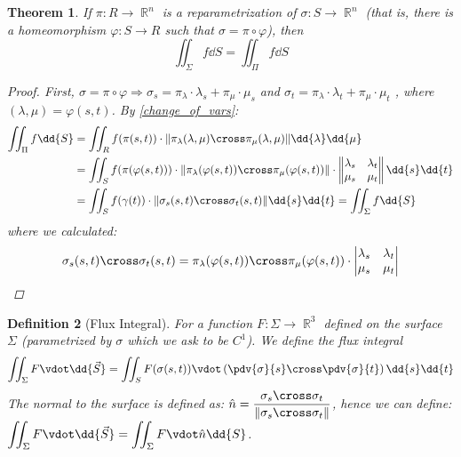 \documentclass[12pt]{article}
\let\RA\Rightarrow
\DeclareMathOperator{\R}{\mathbb{R}}
\newtheorem{theorem}{Theorem}[subsection]
\newtheorem{definition}[theorem]{Definition}
\begin{document}
\begin{theorem}
  If $\pi:R\to\R^n$ is a reparametrization of $\sigma:S\to\R^n$ (that is, there is a homeomorphism $\varphi:S\to R$ such that $\sigma=\pi\circ\varphi$), then $$\iint_{\Sigma} f\dd{S}=\iint_{\Pi} f\dd{S}$$
  \begin{proof}
    First, $\sigma=\pi\circ\varphi\RA \sigma_s=\pi_\lambda\cdot \lambda_s+\pi_\mu\cdot\mu_s$ and $\sigma_t=\pi_\lambda\cdot \lambda_t+\pi_\mu\cdot\mu_t$ , where $(\lambda,\mu)=\varphi(s,t)$. By \ref{change_of_vars}:
    \begin{align*}
      \iint_{\Pi} f\dd{S}&=\iint_{R} f(\pi(s,t))\cdot\|\pi_\lambda(\lambda,\mu)\cross\pi_\mu(\lambda,\mu)\|\dd{\lambda}\dd{\mu}\\
      &=\iint_{S} f(\pi(\varphi(s,t)))\cdot\|\pi_\lambda(\varphi(s,t))\cross\pi_\mu(\varphi(s,t))\|\cdot\begin{Vmatrix}
        \lambda_s &\lambda_t\\ \mu_s &\mu_t
      \end{Vmatrix}\dd{s}\dd{t}\\
      &=\iint_{S}f(\gamma(t))\cdot\|\sigma_s(s,t)\cross\sigma_t(s,t)\|\dd{s}\dd{t}=\iint_{\Sigma} f\dd{S}
    \end{align*}
    where we calculated:
    $$\sigma_s(s,t)\cross\sigma_t(s,t)=\pi_\lambda(\varphi(s,t))\cross\pi_\mu(\varphi(s,t))\cdot\begin{vmatrix}
      \lambda_s &\lambda_t\\ \mu_s &\mu_t
    \end{vmatrix}$$
  \end{proof}
\end{theorem}

\begin{definition}[Flux Integral]
  For a function $F:\Sigma\to\R^3$ defined on the surface $\Sigma$ (parametrized by $\sigma$ which we ask to be $C^1$). We define the flux integral $$\iint_{\Sigma}F\vdot\dd{\vec{S}}=\iint_S F(\sigma(s,t))\vdot\left(\pdv{\sigma}{s}\cross\pdv{\sigma}{t}\right)\dd{s}\dd{t}$$
  The normal to the surface is defined as: $\hat{n}=\dfrac{\sigma_s\cross\sigma_t}{\|\sigma_s\cross\sigma_t\|}$, hence we can define: $\displaystyle\iint_{\Sigma}F\vdot\dd{\vec{S}}=\iint_{\Sigma}F\vdot\hat{n}\dd{S}$.
\end{definition}
\end{document}
